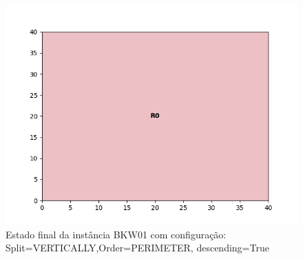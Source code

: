 \begin{figure}[H]
    \centering
    \caption[]{Estado final da instância BKW01 com configuração: Split=VERTICALLY,Order=PERIMETER, descending=True}
    \label{fig:bkw01-vertically-perimeter-true}
    \includegraphics[scale=0.5]{output/figures/bkw/bkw01/vertically/perimeter/true/00}
\end{figure}